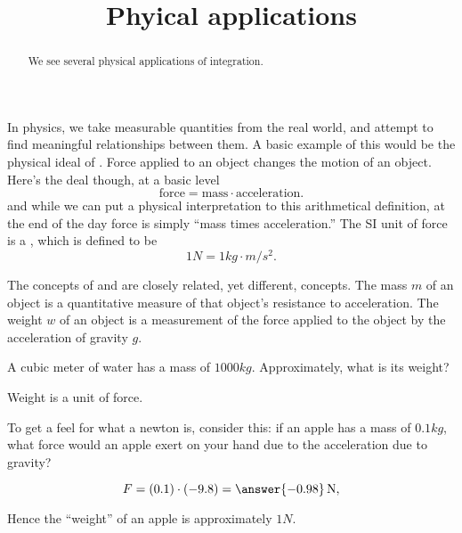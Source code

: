 \documentclass{ximera}
\title[Dig-In:]{Phyical applications}
\begin{document}
\begin{abstract}
We see several physical applications of integration.
\end{abstract}
\maketitle


In physics, we take measurable quantities from the real world, and
attempt to find meaningful relationships between them. A basic example
of this would be the physical ideal of . Force applied to an
object changes the motion of an object. Here's the deal though, at a
basic level
\[
\mathrm{force} = \mathrm{mass} \cdot \mathrm{acceleration}.
\]
and while we can put a physical interpretation to this arithmetical
definition, at the end of the day force is simply ``mass times
acceleration.'' The SI unit of force is a , which is defined to be
\[
1\unit{N} = 1\unit{kg}\cdot \unit{m}/\unit{s}^2. 
\]

\begin{warning}
  The concepts of  and  are closely related, yet
  different, concepts. The mass $m$ of an object is a quantitative
  measure of that object's resistance to acceleration. The weight $w$
  of an object is a measurement of the force applied to the object by
  the acceleration of gravity $g$.
\end{warning}

\begin{question}
  A cubic meter of water has a mass of $1000\unit{kg}$. Approximately,
  what is its weight?
  \begin{multipleChoice}
  \end{multipleChoice}
  \begin{feedback}
    Weight is a unit of force.
  \end{feedback}
\end{question}


\begin{question}
  To get a feel for what a newton is, consider this: if an apple has a
  mass of $0.1\unit{kg}$, what force would an apple exert on your hand
  due to the acceleration due to gravity?
  \begin{prompt}
  \[
  F = (0.1) \cdot (-9.8) = \answer{-0.98}\unit{N},
  \]
  \end{prompt}
\begin{feedback}
  Hence the ``weight'' of an apple is approximately $1\unit{N}$.
\end{feedback}
\end{question}
\end{document}
